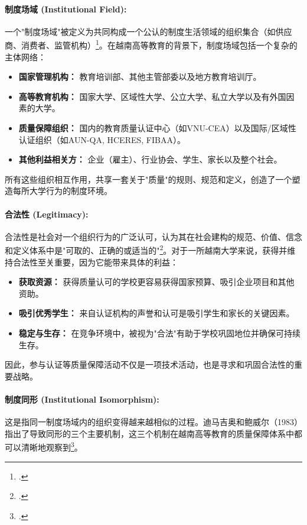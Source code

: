 \paragraph{制度场域 (Institutional Field):}
一个"制度场域"被定义为共同构成一个公认的制度生活领域的组织集合（如供应商、消费者、监管机构）\footcite{DiMaggioPowell1983}。在越南高等教育的背景下，制度场域包括一个复杂的主体网络：
\begin{itemize}
    \item \textbf{国家管理机构：} 教育培训部、其他主管部委以及地方教育培训厅。
    \item \textbf{高等教育机构：} 国家大学、区域性大学、公立大学、私立大学以及有外国因素的大学。
    \item \textbf{质量保障组织：} 国内的教育质量认证中心（如VNU-CEA）以及国际/区域性认证组织（如AUN-QA, HCERES, FIBAA）。
    \item \textbf{其他利益相关方：} 企业（雇主）、行业协会、学生、家长以及整个社会。
\end{itemize}
所有这些组织相互作用，共享一套关于"质量"的规则、规范和定义，创造了一个塑造每所大学行为的制度环境。

\paragraph{合法性 (Legitimacy):}
合法性是社会对一个组织行为的广泛认可，认为其在社会建构的规范、价值、信念和定义体系中是"可取的、正确的或适当的"\footcite{Suchman1995}。对于一所越南大学来说，获得并维持合法性至关重要，因为它能带来具体的利益：
\begin{itemize}
    \item \textbf{获取资源：} 获得质量认可的学校更容易获得国家预算、吸引企业项目和其他资助。
    \item \textbf{吸引优秀学生：} 来自认证机构的声誉和认可是吸引学生和家长的关键因素。
    \item \textbf{稳定与生存：} 在竞争环境中，被视为"合法"有助于学校巩固地位并确保可持续生存。
\end{itemize}
因此，参与认证等质量保障活动不仅是一项技术活动，也是寻求和巩固合法性的重要战略。

\paragraph{制度同形 (Institutional Isomorphism):}
这是指同一制度场域内的组织变得越来越相似的过程。迪马吉奥和鲍威尔（1983）指出了导致同形的三个主要机制，这三个机制在越南高等教育的质量保障体系中都可以清晰地观察到\footcite{DiMaggioPowell1983}。

